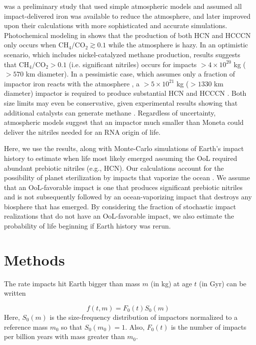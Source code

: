 \documentclass{Liebert_Author}
\begin{document}
\citet{Zahnle_2020} was a preliminary study that used simple atmospheric models and assumed all impact-delivered iron was available to reduce the atmosphere, and later \citet{Wogan_2023} improved upon their calculations with more sophisticated and accurate simulations. Photochemical modeling in \citet{Wogan_2023} shows that the production of both HCN and HCCCN only occurs when $\mathrm{CH_4} / \mathrm{CO_2} \gtrsim 0.1$ while the atmosphere is hazy. In an optimistic scenario, which includes nickel-catalyzed methane production, results suggests that $\mathrm{CH_4} / \mathrm{CO_2} > 0.1$ (i.e. significant nitriles) occurs for impacts $> 4 \times 10^{20}$ kg ($> 570$ km diameter). In a pessimistic case, which assumes only a fraction of impactor iron reacts with the atmosphere \citep{Citron_2022,Marchi_2018}, a $> 5 \times 10^{21}$ kg ($> 1330$ km diameter) impactor is required to produce substantial HCN and HCCCN \citep{Wogan_2023}. Both size limits may even be conservative, given experimental results showing that additional catalysts can generate methane \citep{Hill_2003,Nuth_2016,Nuth_2020}. Regardless of uncertainty, atmospheric models suggest that an impactor much smaller than Moneta could deliver the nitriles needed for an RNA origin of life.

Here, we use the \citet{Wogan_2023} results, along with Monte-Carlo simulations of Earth's impact history to estimate when life most likely emerged assuming the OoL required abundant prebiotic nitriles (e.g., HCN). 
Our calculations account for the possibility of planet sterilization by impacts that vaporize the ocean \citep{Sleep_1989,Maher_1988}. We assume that an OoL-favorable impact is one that produces significant prebiotic nitriles and is not subsequently followed by an ocean-vaporizing impact that destroys any biosphere that has emerged. By considering the fraction of stochastic impact realizations that do not have an OoL-favorable impact, we also estimate the probability of life beginning if Earth history was rerun.

\section{Methods} \label{sec:methods}
The rate impacts hit Earth bigger than mass $m$ (in kg) at age $t$ (in Gyr) can be written

\begin{equation}
  f(t,m) = F_0(t) S_0(m)
\end{equation}
Here, $S_0(m)$ is the size-frequency distribution of impactors normalized to a reference mass $m_0$ so that $S_0(m_0) = 1$. Also, $F_0(t)$ is the number of impacts per billion years with mass greater than $m_0$.
\end{document}
